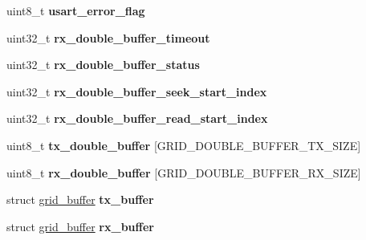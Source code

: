 \begin{DoxyCompactItemize}
\item 
\hypertarget{structgrid__port_a1fca59d2965e383a20b4e40212f11b46}{uint8\-\_\-t {\bfseries usart\-\_\-error\-\_\-flag}}\label{structgrid__port_a1fca59d2965e383a20b4e40212f11b46}

\item 
\hypertarget{structgrid__port_aabe23e485c516b5d8a6a8c359be9bbe4}{uint32\-\_\-t {\bfseries rx\-\_\-double\-\_\-buffer\-\_\-timeout}}\label{structgrid__port_aabe23e485c516b5d8a6a8c359be9bbe4}

\item 
\hypertarget{structgrid__port_a29dfaa161a14ea91bede8a4e2a78c607}{uint32\-\_\-t {\bfseries rx\-\_\-double\-\_\-buffer\-\_\-status}}\label{structgrid__port_a29dfaa161a14ea91bede8a4e2a78c607}

\item 
\hypertarget{structgrid__port_a1cd9d330b5c6ad6f2a9f07e2fb3cec5c}{uint32\-\_\-t {\bfseries rx\-\_\-double\-\_\-buffer\-\_\-seek\-\_\-start\-\_\-index}}\label{structgrid__port_a1cd9d330b5c6ad6f2a9f07e2fb3cec5c}

\item 
\hypertarget{structgrid__port_a8308226aec5b91111d75392ec092a08d}{uint32\-\_\-t {\bfseries rx\-\_\-double\-\_\-buffer\-\_\-read\-\_\-start\-\_\-index}}\label{structgrid__port_a8308226aec5b91111d75392ec092a08d}

\item 
\hypertarget{structgrid__port_a455c82d5480f5389aa3d3ee03d37974e}{uint8\-\_\-t {\bfseries tx\-\_\-double\-\_\-buffer} \mbox{[}G\-R\-I\-D\-\_\-\-D\-O\-U\-B\-L\-E\-\_\-\-B\-U\-F\-F\-E\-R\-\_\-\-T\-X\-\_\-\-S\-I\-Z\-E\mbox{]}}\label{structgrid__port_a455c82d5480f5389aa3d3ee03d37974e}

\item 
\hypertarget{structgrid__port_a631c7878b3f1773ff463b2302783a3a7}{uint8\-\_\-t {\bfseries rx\-\_\-double\-\_\-buffer} \mbox{[}G\-R\-I\-D\-\_\-\-D\-O\-U\-B\-L\-E\-\_\-\-B\-U\-F\-F\-E\-R\-\_\-\-R\-X\-\_\-\-S\-I\-Z\-E\mbox{]}}\label{structgrid__port_a631c7878b3f1773ff463b2302783a3a7}

\item 
\hypertarget{structgrid__port_a43992c962f26377543663cc264c0dc6e}{struct \hyperlink{structgrid__buffer}{grid\-\_\-buffer} {\bfseries tx\-\_\-buffer}}\label{structgrid__port_a43992c962f26377543663cc264c0dc6e}

\item 
\hypertarget{structgrid__port_a831c008d589b8c22965156c37a17c766}{struct \hyperlink{structgrid__buffer}{grid\-\_\-buffer} {\bfseries rx\-\_\-buffer}}\label{structgrid__port_a831c008d589b8c22965156c37a17c766}


\end{DoxyCompactItemize}
